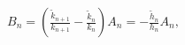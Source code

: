 $B_{n}=\left(\frac{\tilde{k}_{n+1}}{k_{n+1}}-\frac{\tilde{k}_{n}}{k_{n}}\right)%
A_{n}=-\frac{\tilde{h}_{n}}{h_{n}}A_{n},$